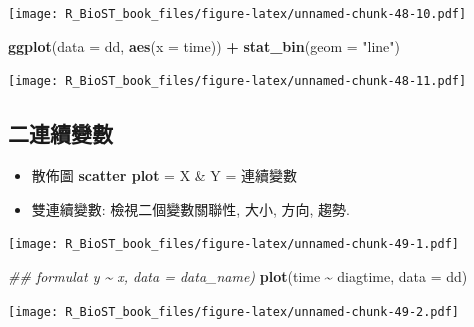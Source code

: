 \documentclass[
]{book}
\newenvironment{Shaded}{\begin{snugshade}}{\end{snugshade}}
\newcommand{\CommentTok}[1]{\textcolor[rgb]{0.56,0.35,0.01}{\textit{#1}}}
\newcommand{\DataTypeTok}[1]{\textcolor[rgb]{0.13,0.29,0.53}{#1}}
\newcommand{\KeywordTok}[1]{\textcolor[rgb]{0.13,0.29,0.53}{\textbf{#1}}}
\newcommand{\NormalTok}[1]{#1}
\newcommand{\OperatorTok}[1]{\textcolor[rgb]{0.81,0.36,0.00}{\textbf{#1}}}
\newcommand{\StringTok}[1]{\textcolor[rgb]{0.31,0.60,0.02}{#1}}
\providecommand{\tightlist}{%
  \setlength{\itemsep}{0pt}\setlength{\parskip}{0pt}}
\begin{document}
\texttt{[image: R\_BioST\_book\_files/figure-latex/unnamed-chunk-48-10.pdf]}

\begin{Shaded}
\begin{Highlighting}[]
\KeywordTok{ggplot}\NormalTok{(}\DataTypeTok{data =}\NormalTok{ dd, }\KeywordTok{aes}\NormalTok{(}\DataTypeTok{x =}\NormalTok{ time)) }\OperatorTok{+}\StringTok{ }
\StringTok{  }\KeywordTok{stat\_bin}\NormalTok{(}\DataTypeTok{geom =} \StringTok{"line"}\NormalTok{)}
\end{Highlighting}
\end{Shaded}

\texttt{[image: R\_BioST\_book\_files/figure-latex/unnamed-chunk-48-11.pdf]}

\hypertarget{ux4e8cux9023ux7e8cux8b8aux6578}{%
\subsection{二連續變數}\label{ux4e8cux9023ux7e8cux8b8aux6578}}

\begin{itemize}
\tightlist
\item
  散佈圖 \textbf{scatter plot} = X \& Y = 連續變數
\item
  雙連續變數: 檢視二個變數關聯性, 大小, 方向, 趨勢.
\end{itemize}

\begin{Shaded}
\end{Shaded}

\texttt{[image: R\_BioST\_book\_files/figure-latex/unnamed-chunk-49-1.pdf]}

\begin{Shaded}
\begin{Highlighting}[]
\CommentTok{\#\# formulat y \textasciitilde{} x, data = data\_name)}
\KeywordTok{plot}\NormalTok{(time }\OperatorTok{\textasciitilde{}}\StringTok{ }\NormalTok{diagtime, }\DataTypeTok{data =}\NormalTok{ dd)}
\end{Highlighting}
\end{Shaded}

\texttt{[image: R\_BioST\_book\_files/figure-latex/unnamed-chunk-49-2.pdf]}
\end{document}
